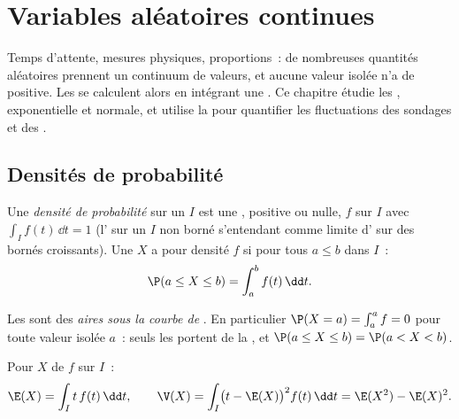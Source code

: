 \chapter{Variables aléatoires continues}\label{ch:g12:contdist}

Temps d'attente, mesures physiques, proportions~: de nombreuses quantités
aléatoires prennent un continuum de valeurs, et aucune valeur isolée n'a
de  positive. Les  se calculent alors en intégrant
une \emph{}. Ce chapitre étudie les , exponentielle et
normale, et utilise la  pour quantifier les fluctuations des
sondages et des .

\section{Densités de probabilité}

\begin{definition}\label{def:g12:contdist:density}
Une \emph{densité de probabilité} sur un  $I$ est
une  , positive ou nulle, $f$ sur $I$ avec
$\int_I f(t)\,\dd t = 1$ (l' sur un $I$ non borné s'entendant comme
limite d' sur des  bornés croissants). Une  $X$ a pour densité $f$ si pour tous $a \leq b$ dans $I$~:
\[
\P(a \leq X \leq b) = \int_a^b f(t)\,\dd t .
\]
\end{definition}

Les  sont des \emph{aires sous la courbe de }. En
particulier $\P(X = a) = \int_a^a f = 0$ pour toute valeur isolée $a$~: seuls
les  portent de la , et
$\P(a \leq X \leq b) = \P(a < X < b)$.

\begin{definition}\label{def:g12:contdist:exp}
Pour $X$ de  $f$ sur $I$~:
\[
\E(X) = \int_I t\,f(t)\,\dd t, \qquad
\V(X) = \int_I \bigl(t - \E(X)\bigr)^2 f(t)\,\dd t
= \E(X^2) - \E(X)^2 .
\]
\end{definition}

